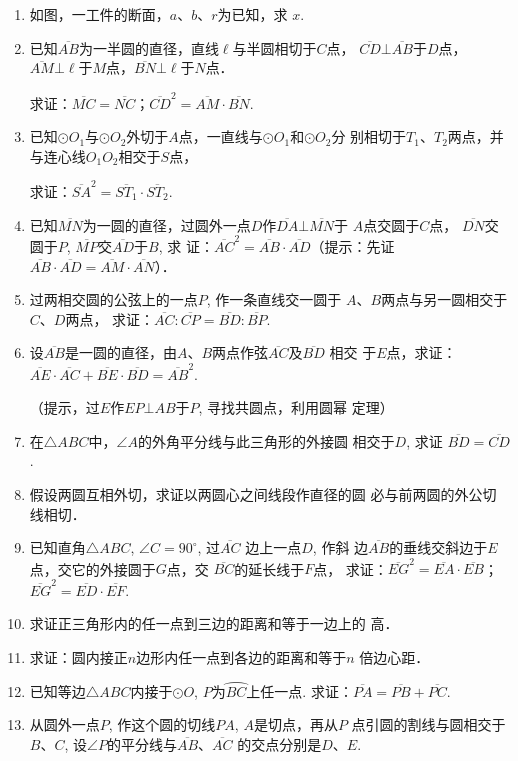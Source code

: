 \begin{enumerate}
\begin{figure}[htp]
\begin{minipage}[t]{0.48\textwidth}
\begin{tikzpicture}[>=latex, scale=1.5]
    \end{tikzpicture}
    \caption*{第8题}
    \end{minipage}
    \end{figure}

\item 如图，一工件的断面，$a$、$b$、$r$为已知，求
$x$.
\item 已知$\overline{AB}$为一半圆的直径，直线$\ell$与半圆相切于$C$点，
$\overline{CD}\bot\overline{AB}$于$D$点，$\overline{AM}\bot \ell$于$M$点，$\overline{BN}\bot \ell$于$N$点．

求证：$\overline{MC}=\overline{NC}$；$\overline{CD}^2=\overline{AM}\cdot \overline{BN}$.

\item 已知$\odot O_1$与$\odot O_2$外切于$A$点，一直线与$\odot O_1$和$\odot O_2$分
别相切于$T_1$、$T_2$两点，并与连心线$O_1O_2$相交于$S$点，

求证：$\overline{SA}^2=\overline{ST_1}\cdot \overline{ST_2}$.
\item 已知$\overline{MN}$为一圆的直径，过圆外一点$D$作$\overline{DA}\bot \overline{MN}$于
$A$点交圆于$C$点，
$\overline{DN}$交圆于$P$, $\overline{MP}$交$\overline{AD}$于$B$, 求
证：$\overline{AC}^2=\overline{AB}\cdot \overline{AD}$（提示：先证$\overline{AB}\cdot \overline{AD}=\overline{AM}\cdot 
\overline{AN}$）．
\item 过两相交圆的公弦上的一点$P$, 作一条直线交一圆于
$A$、$B$两点与另一圆相交于$C$、$D$两点，
求证：$\overline{AC}:\overline{CP}=\overline{BD}:\overline{BP}$.
\item 设$\overline{AB}$是一圆的直径，由$A$、$B$两点作弦$\overline{AC}$及$\overline{BD}$
相交
于$E$点，求证：$\overline{AE}\cdot \overline{AC}+\overline{BE}\cdot \overline{BD}=\overline{AB}^2$.

（提示，过$E$作$EP\bot AB$于$P$, 寻找共圆点，利用圆幂
定理）
\item 在$\triangle ABC$中，$\angle A$的外角平分线与此三角形的外接圆
相交于$D$, 求证 $\overline{BD}=\overline{CD}$.
\item 假设两圆互相外切，求证以两圆心之间线段作直径的圆
必与前两圆的外公切线相切．
\item 已知直角$\triangle ABC$, $\angle C=90^{\circ}$, 过$\overline{AC}$
边上一点$D$, 作斜
边$\overline{AB}$的垂线交斜边于$E$点，交它的外接圆于$G$点，交
$\overline{BC}$的延长线于$F$点，
求证：$\overline{EG}^2=\overline{EA}\cdot \overline{EB}$；$\overline{EG}^2=\overline{ED}\cdot \overline{EF}$.
\item 求证正三角形内的任一点到三边的距离和等于一边上的
高．
\item 求证：圆内接正$n$边形内任一点到各边的距离和等于$n$
倍边心距．
\item 已知等边$\triangle ABC$内接于$\odot O$, $P$为$\wideparen{BC}$上任一点. 
求证：$\overline{PA}=\overline{PB}+\overline{PC}$.
\item 从圆外一点$P$, 作这个圆的切线$PA$, $A$是切点，再从$P$
点引圆的割线与圆相交于$B$、$C$, 设$\angle P$的平分线与$\overline{AB}$、$\overline{AC}$
的交点分别是$D$、$E$. 


\end{enumerate}
